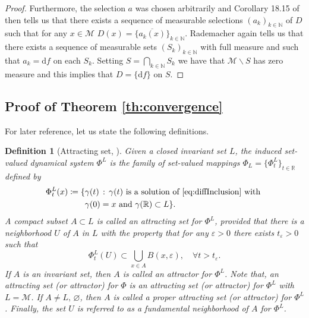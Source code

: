 \documentclass{article}
\newtheorem{definition}{Definition}
\newcommand{\CM}{\mathcal{M}}
\newcommand{\BR}{\mathbb{R}}
\newcommand{\BN}{\mathbb{N}}
\newcommand{\rd}{\mathrm{d}}
\begin{document}
\begin{proof}
    Furthermore, the selection $a$ was chosen arbitrarily and Corollary 18.15 of \cite{aliprantisborder} then tells us that there exists a sequence of measurable selections $(a_k)_{k\in\BN}$ of $D$ such that for any $x\in\CM$ $D(x)=\overline{\{a_k(x)\}}_{k\in\BN}$. Rademacher again tells us that there exists a sequence of measurable sets $(S_k)_{k\in\BN}$ with full measure and such that $a_k=\rd f$ on each $S_k$. Setting $S=\bigcap_{k\in\BN}S_k$ we have that $\CM\backslash S$ has zero measure and this implies that $D=\{\rd f\}$ on $S$. 
    
\end{proof}

\subsection{Proof of Theorem \ref{th:convergence}}\label{sec:appthmhdim}

For later reference, let us state the following definitions.



\begin{definition}[Attracting set, \cite{benaim2005stochastic}]
    Given a closed invariant set $L$, the induced set-valued dynamical system $\Phi^L$ is the family of set-valued mappings $\Phi_L=\{\Phi_t^L\}_{t\in\BR}$ defined by
    \begin{equation}
        \begin{aligned}
            \Phi_t^L(x)\coloneqq \{& \gamma(t)\,:\, \gamma(t) \text{ is a solution of \eqref{eq:diffInclusion} with }\\
            &\gamma(0)=x \text{ and } \gamma(\BR)\subset L\}.
        \end{aligned} 
    \end{equation}
    A compact subset $A\subset L$ is called an \emph{attracting set} for $\Phi^L$, provided that there is a neighborhood $U$ of $A$ in $L$ with the property that for any $\varepsilon>0$ there exists $t_\varepsilon>0$ such that
    \begin{equation}
        \Phi_t^L(U)\subset \bigcup_{x\in A}B(x,\varepsilon),\quad \forall t>t_\varepsilon.
    \end{equation}
    If $A$ is an invariant set, then $A$ is called an \emph{attractor} for $\Phi^L$. Note that, an attracting set (or attractor) for $\Phi$ is an attracting set (or attractor) for $\Phi^L$ with $L=\CM$. If $A\neq L,\,\varnothing$, then $A$ is called a \emph{proper} attracting set (or attractor) for $\Phi^L$. 
    Finally, the set $U$ is referred to as a \emph{fundamental neighborhood} of $A$ for $\Phi^L$.
\end{definition}
\end{document}
